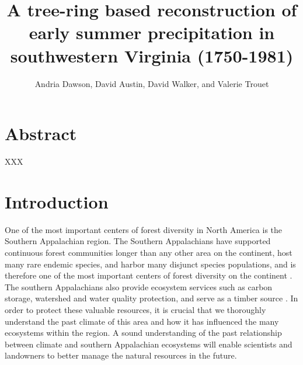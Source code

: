 \documentclass[11pt]{article}
\begin{document}
\title{A tree-ring based reconstruction of early summer precipitation in southwestern Virginia {(1750-1981)}}
\author{Andria Dawson, David Austin, David Walker, and Valerie Trouet}

\maketitle

\section*{Abstract}

XXX


\section{Introduction}
\label{sec:intro}


One of the most important centers of forest diversity in North America is the Southern Appalachian region. The Southern Appalachians have supported continuous forest communities longer than any other area on the continent, host many rare endemic species, and harbor many disjunct species populations, and is therefore one of the most important centers of forest diversity on the continent \cite{NCNHP2012}. The southern Appalachians also provide ecosystem services such as carbon storage, watershed and water quality protection, and serve as a timber source \cite{zipper2011restoring}. In order to protect these valuable resources, it is crucial that we thoroughly understand the past climate of this area and how it has influenced the many ecosystems within the region.  A sound understanding of the past relationship between climate and southern Appalachian ecosystems will enable scientists and landowners to better manage the natural resources in the future. 
\end{document}
